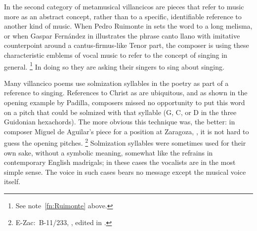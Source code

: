 In the second category of metamusical villancicos are pieces that refer to music more as an abstract concept, rather than to a specific, identifiable reference to another kind of music.
When Pedro Ruimonte in  sets the word   to a long melisma, or when Gaspar Fernández in  illustrates the phrase {canto llano}  with imitative counterpoint around a cantus-firmus-like Tenor part, the composer is using these characteristic emblems of vocal music to refer to the concept of singing in general.%
	\footnote{%
	See note~\ref{fn:Ruimonte} above.
	}
In doing so they are asking their singers to sing about singing.

Many villancico poems use solmization syllables in the poetry as part of a reference to singing.
References to Christ as   are ubiquitous, and as shown in the opening example by Padilla, composers missed no opportunity to put this word on a pitch that could be solmized with that syllable (G, C, or D in the three Guidonian hexachords).
The more obvious this technique was, the better: in composer Miguel de Aguilar's   piece for a position at Zaragoza,  , it is not hard to guess the opening pitches.%
	\footnote{%
	E-Zac:~B-11/233, , edited in \autocite[34--64]{Ezquerro:MME55}.
	}
Solmization syllables were sometimes used for their own sake, without a symbolic meaning, somewhat like the  refrains in contemporary English madrigals; in these cases the vocalists are  in the most simple sense.
The voice in such cases bears no message except the musical voice itself.

